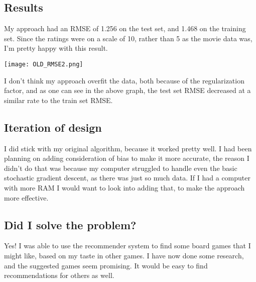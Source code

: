 \documentclass[11pt]{article}
\begin{document}
\subsection{Results}
My approach had an RMSE of 1.256 on the test set, and 1.468 on the training set. Since the ratings were on a scale of 10, rather than 5 as the movie data was, I'm pretty happy with this result.
\begin{center}
\texttt{[image: OLD\_RMSE2.png]}
\end{center}
I don't think my approach overfit the data, both because of the regularization factor, and as one can see in the above graph, the test set RMSE decreased at a similar rate to the train set RMSE.
\subsection{Iteration of design}
I did stick with my original algorithm, because it worked pretty well. I had been planning on adding consideration of bias to make it more accurate, the reason I didn't do that was because my computer struggled to handle even the basic stochastic gradient descent, as there was just so much data. If I had a computer with more RAM I would want to look into adding that, to make the approach more effective.
\subsection{Did I solve the problem?}
Yes! I was able to use the recommender system to find some board games that I might like, based on my taste in other games. I have now done some research, and the suggested games seem promising. It would be easy to find recommendations for others as well.
\end{document}
